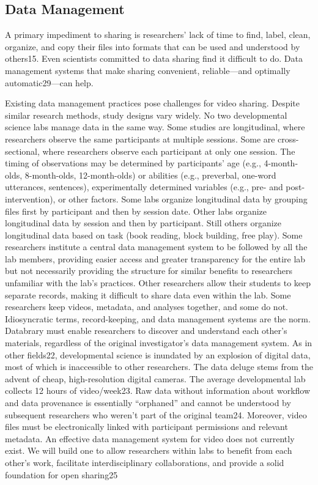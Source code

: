 \documentclass[letterpaper,man,natbib]{apa6}
\begin{document}
\subsection{Data Management}
A primary impediment to sharing is researchers’ lack of time to find, label, clean, organize, and copy their files into formats that can be used and understood by others15. 
Even scientists committed to data sharing find it difficult to do. Data management systems that make sharing convenient, reliable—and optimally automatic29—can help.

Existing data management practices pose challenges for video sharing.
Despite similar research methods, study designs vary widely. 
No two developmental science labs manage data in the same way. 
Some studies are longitudinal, where researchers observe the same participants at
multiple sessions. 
Some are cross-sectional, where researchers observe
each participant at only one session. 
The timing of observations may be
determined by participants’ age (e.g., 4-month-olds, 8-month-olds,
12-month-olds) or abilities (e.g., preverbal, one-word utterances,
sentences), experimentally determined variables (e.g., pre- and
post-intervention), or other factors. 
Some labs organize longitudinal data by grouping files first by participant and then by session date.
Other labs organize longitudinal data by session and then by
participant. 
Still others organize longitudinal data based on task (book reading, block building, free play). Some researchers institute a central data management system to be followed by all the lab members, providing easier access and greater transparency for the entire lab but not necessarily providing the structure for similar benefits to
researchers unfamiliar with the lab’s practices. 
Other researchers allow their students to keep separate records, making it difficult to share
data even within the lab. 
Some researchers keep videos, metadata, and analyses together, and some do not. Idiosyncratic terms, record-keeping, and data management systems are the norm. 
Databrary must enable researchers to discover and understand each other’s materials, regardless of the original investigator’s data management system.
As in other fields22, developmental science is inundated by an explosion of digital data, most of which is inaccessible to other researchers. The data deluge stems from the advent of cheap, high-resolution digital cameras. The average developmental lab collects 12 hours of video/week23. Raw data without information about workflow and data provenance is essentially “orphaned” and cannot be understood by subsequent researchers who weren’t part of the original team24. Moreover, video files must be electronically linked with participant permissions and relevant metadata. An effective data management system for video does not currently exist. We will build one to allow researchers within labs to benefit from each other’s work, facilitate interdisciplinary collaborations, and provide a solid foundation for open sharing25
\end{document}
